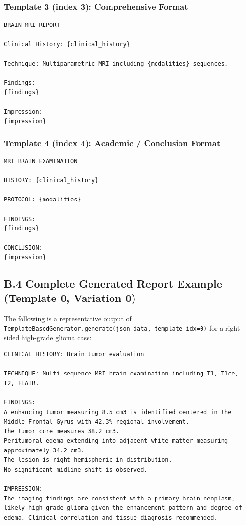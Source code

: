 \documentclass[conference]{IEEEtran}
\begin{document}
\subsubsection*{Template 3 (index 3): Comprehensive Format}

\begin{lstlisting}[style=reporttext]
BRAIN MRI REPORT

Clinical History: {clinical_history}

Technique: Multiparametric MRI including {modalities} sequences.

Findings:
{findings}

Impression:
{impression}
\end{lstlisting}

\subsubsection*{Template 4 (index 4): Academic / Conclusion Format}

\begin{lstlisting}[style=reporttext]
MRI BRAIN EXAMINATION

HISTORY: {clinical_history}

PROTOCOL: {modalities}

FINDINGS:
{findings}

CONCLUSION:
{impression}
\end{lstlisting}

\subsection*{B.4 Complete Generated Report Example (Template 0, Variation 0)}

The following is a representative output of \texttt{TemplateBasedGenerator.generate(json\_data, template\_idx=0)} for a right-sided high-grade glioma case:

\begin{lstlisting}[style=reporttext]
CLINICAL HISTORY: Brain tumor evaluation

TECHNIQUE: Multi-sequence MRI brain examination including T1, T1ce, T2, FLAIR.

FINDINGS:
A enhancing tumor measuring 8.5 cm3 is identified centered in the
Middle Frontal Gyrus with 42.3% regional involvement.
The tumor core measures 38.2 cm3.
Peritumoral edema extending into adjacent white matter measuring
approximately 34.2 cm3.
The lesion is right hemispheric in distribution.
No significant midline shift is observed.

IMPRESSION:
The imaging findings are consistent with a primary brain neoplasm,
likely high-grade glioma given the enhancement pattern and degree of
edema. Clinical correlation and tissue diagnosis recommended.
\end{lstlisting}
\end{document}
